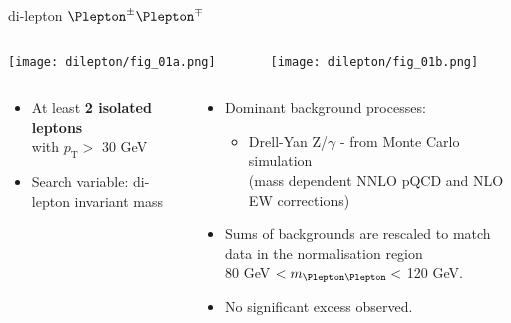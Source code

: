 \documentclass[8pt]{beamer}
\begin{document}
 \begin{frame}{\large di-lepton $\Plepton^{\pm}\Plepton^{\mp}$}
    \begin{columns}
   \begin{column}{6cm}
    \texttt{[image: dilepton/fig\_01a.png]}\\
   \end{column}
   \begin{column}{6cm}
    \texttt{[image: dilepton/fig\_01b.png]}\\
   \end{column}
  \end{columns}
  \begin{columns}
   \begin{column}{6cm}
    \begin{itemize}
     \item At least \textbf{2 isolated leptons} \\with $p_\mathrm{T} >$ 30 GeV
     \vspace{0.2cm}
     \item Search variable: di-lepton invariant mass
    \end{itemize}
   \end{column}
   \begin{column}{6cm}
    \begin{itemize}
     \item Dominant background processes:
     \begin{itemize}
      \item Drell-Yan Z/$\gamma$ - from Monte Carlo simulation\\ {\scriptsize (mass dependent NNLO pQCD and NLO EW corrections)}
     \end{itemize}
     \item Sums of backgrounds are rescaled to match data 
	   in the normalisation region \\ 80 GeV $< m_{\Plepton\Plepton} <$ 120 GeV.
     \item No significant excess observed.
    \end{itemize}
     
   \end{column}
  \end{columns}
  
 \end{frame}
\end{document}
